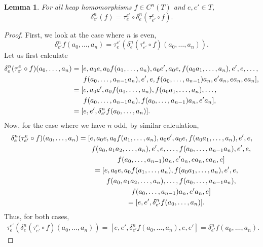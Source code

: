 \documentclass[pdftex]{sigma}
\numberwithin{equation}{section}
\newtheorem{Lemma}[Theorem]{Lemma}
\begin{document}
\begin{Lemma} \label{complem}
For all heap homomorphisms $f\in C^n(T)$ and $e,e'\in T$,
\[
\delta^{n}_{e'} ( f )= \tau_{e}^{e'} \circ \delta^{n}_{e} ( \tau^{e}_{e'} \circ f). \]
\end{Lemma}
\begin{proof}
First, we look at the case where $n$ is even,
\[\delta^{n}_{e'} f(a_0,\dots,a_n) = \tau^{e'}_{e} (\delta^{n}_{e}(\tau^{e}_{e'} \circ f)(a_0,\dots,a_n) ). \]
Let us first calculate
\begin{align*}
 &\delta^n_{e} (\tau^e_{e'} \circ f)(a_0 ,\dots, a_n) = [e,a_0 e, a_0 f(a_1,\dots,a_n), a_0 e', a_0 e,f(a_0 a_1,\dots,a_n),e',e,\dots, \\
 & \hphantom{\delta^n_{e} (\tau^e_{e'} \circ f)(a_0 ,\dots, a_n) =[}{} f(a_0,\dots,a_{n-1}a_n),e',e,f(a_0,\dots,a_{n-1})a_n,e' a_n,ea_n,ea_n], \\
 & \hphantom{\delta^n_{e} (\tau^e_{e'} \circ f)(a_0 ,\dots, a_n) }{} =[e,a_0 e', a_0 f(a_1,\dots,a_n),f(a_0 a_1,\dots,a_n),\dots, \\
 & \hphantom{\delta^n_{e} (\tau^e_{e'} \circ f)(a_0 ,\dots, a_n) =[}{}  f(a_0,\dots,a_{n-1} a_n), f(a_0,\dots,a_{n-1})a_n,e' a_n], \\
 & \hphantom{\delta^n_{e} (\tau^e_{e'} \circ f)(a_0 ,\dots, a_n)}{} = [e,e', \delta^n_{e'} f(a_0,\dots,a_n)].
\end{align*}
Now, for the case where we have $n$ odd, by similar calculation,
\begin{gather*}
 \delta^n_{e} (\tau^e_{e'} \circ f)(a_0 ,\dots, a_n) = [e,a_0 e, a_0 f(a_1,\dots,a_n), a_0 e', a_0 e,f(a_0 a_1,\dots,a_n),e',e, \\
\hphantom{\delta^n_{e} (\tau^e_{e'} \circ f)(a_0 ,\dots, a_n) = [}{}
 f(a_0, a_1 a_2,\dots,a_n),e',e, \dots,f(a_0,\dots,a_{n-1}a_n),e',e, \\
\hphantom{\delta^n_{e} (\tau^e_{e'} \circ f)(a_0 ,\dots, a_n) = [}{} f(a_0,\dots,a_{n-1})a_n,e' a_n,ea_n,ea_n,e] \\
\hphantom{\delta^n_{e} (\tau^e_{e'} \circ f)(a_0 ,\dots, a_n) }{} = [e,a_0 e,a_0 f(a_1,\dots,a_n), f(a_0 a_1,\dots,a_n),e',e, \\
\hphantom{\delta^n_{e} (\tau^e_{e'} \circ f)(a_0 ,\dots, a_n) = [}{} f(a_0,a_1 a_2,\dots,a_n),\dots,f(a_0,\dots,a_{n-1}a_n), \\
\hphantom{\delta^n_{e} (\tau^e_{e'} \circ f)(a_0 ,\dots, a_n) = [}{} f(a_0,\dots,a_{n-1})a_n,e' a_n,e]\\
\hphantom{\delta^n_{e} (\tau^e_{e'} \circ f)(a_0 ,\dots, a_n)}{} =[e,e', \delta^n_{e'} f(a_0,\dots,a_n)].
\end{gather*}
Thus, for both cases,
\begin{align*}
\tau^{e'}_e (\delta^n_e (\tau^e_{e'} \circ f)(a_0,\dots,a_n)) = [e,e',\delta^n_{e'} f(a_0,\dots,a_n),e,e'] = \delta^n_{e'} f(a_0,\dots,a_n).\tag*{\qed}
\end{align*} \renewcommand{\qed}{}
\end{proof}
\end{document}
